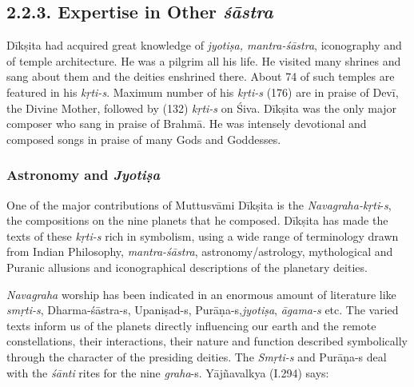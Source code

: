 \vspace{-.3cm}

\subsection*{2.2.3. Expertise in Other \textit{śāstra}}

Dīkṣita had acquired great knowledge of \textit{jyotiṣa, mantra-śāstra}, iconography and of temple architecture. He was a pilgrim all his life. He visited many shrines and sang about them and the deities enshrined there. About 74 of such temples are featured in his \textit{kṛti-s}. Maximum number of his \textit{kṛti-s} (176) are in praise of Devī, the Divine Mother, followed by (132) \textit{kṛti-s} on Śiva. Dīkṣita was the only major composer who sang in praise of Brahmā. He was intensely devotional and composed songs in praise of many Gods and Goddesses.

\vspace{-.2cm}

\subsubsection*{Astronomy and \textit{Jyotiṣa}}

\vspace{-.2cm}

One of the major contributions of Muttusvāmi Dīkṣita is the \textit{Navagraha-kṛti}-\textit{s}, the compositions on the nine planets that he composed. Dīkṣita has made the texts of these \textit{kṛti-s} rich in symbolism, using a wide range of terminology drawn from Indian Philosophy, \textit{mantra-śāstra}, astronomy/astrology, mythological and Puranic allusions and iconographical descriptions of the planetary deities.

\textit{Navagraha} worship has been indicated in an enormous amount of literature like \textit{smṛti-s}, Dharma-śāstra-s, Upaniṣad-s, Purāṇa-s,\break \textit{jyotiṣa}, \textit{āgama-s} etc. The varied texts inform us of the planets directly influencing our earth and the remote constellations, their interactions, their nature and function described symbolically through the character of the presiding deities. The \textit{Smṛti-s} and Purāṇa-s deal with the \textit{śānti} rites for the nine \textit{graha}-s. Yājñavalkya (I.294) says:

